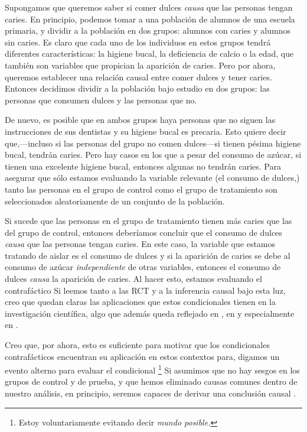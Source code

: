 Supongamos que queremos saber si comer dulces \emph{causa}
que las personas tengan caries. En principio, podemos tomar
a una población de alumnos de una escuela primaria, y
dividir a la población en dos grupos: alumnos con caries y
alumnos sin caries. Es claro que cada uno de los individuos
en estos grupos tendrá diferentes características: la
higiene bucal, la deficiencia de calcio o la edad, que
también son variables que propician la aparición de caries.
Pero por ahora, queremos establecer una relación causal
entre comer dulces y tener caries. Entonces decidimos
dividir a la población bajo estudio en dos grupos: las
personas que consumen dulces y las personas que no.

De nuevo, es posible que en ambos grupos haya personas que
no siguen las instrucciones de sus dentistas y su higiene
bucal es precaria. Esto quiere decir que,---incluso si las
personas del grupo no comen dulces---si tienen pésima
higiene bucal, tendrán caries. Pero hay
casos en los que a pesar del consumo de azúcar, si tienen
una excelente higiene bucal, entonces algunas no tendrán
caries. Para asegurar que sólo estamos evaluando la variable
relevante (el consumo de dulces,) tanto las personas en el
grupo de control como el grupo de tratamiento son
seleccionados aleatoriamente de un conjunto de la 
población.

Si sucede que las personas en el grupo de tratamiento tienen
más caries que las del grupo de control, entonces deberíamos
concluir que el consumo de dulces \emph{causa} que las
personas tengan caries. En este caso, la variable que
estamos tratando de aislar es el consumo de dulces y si la
aparición de caries se debe al consumo de azúcar
\emph{independiente} de otras variables, entonces el consumo
de dulces \emph{causa} la aparición de caries. Al hacer
esto, estamos evaluando el contrafáctico  Si
leemos tanto a las RCT y a la inferencia causal bajo esta
luz, creo que quedan claras las aplicaciones que estos
condicionales tienen en la investigación científica, algo
que además queda reflejado en
\parencite{Pearl2016}, en \parencite{Pearl2018} y
especialmente en \parencite{llaudet2023}.

Creo que, por ahora, esto es suficiente para motivar que los
condicionales contrafácticos encuentran su aplicación en
estos contextos para, digamos  un evento alterno
para evaluar el condicional \footnote{
	Estoy voluntariamente evitando decir \emph{mundo posible.}
} 
Si asumimos que no hay sesgos en los grupos de control y
de prueba, y que hemos eliminado causas comunes dentro de
nuestro análisis, en principio, seremos capaces de derivar
una conclusión causal \parencite{Otsuka2023}.

